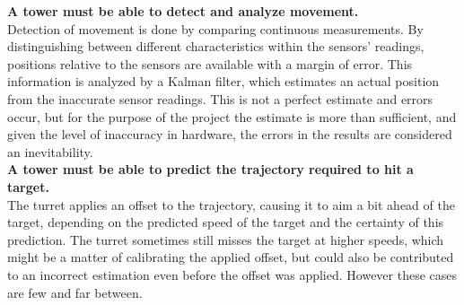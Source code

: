 \textbf{A tower must be able to detect and analyze movement.} \\
Detection of movement is done by comparing continuous measurements. By distinguishing between different characteristics within the sensors' readings, positions relative to the sensors are available with a margin of error. This information is analyzed by a Kalman filter, which estimates an actual position from the inaccurate sensor readings. This is not a perfect estimate and errors occur, but for the purpose of the project the estimate is more than sufficient, and given the level of inaccuracy in hardware, the errors in the results are considered an inevitability. \\


\textbf{A tower must be able to predict the trajectory required to hit a target.} \\
The turret applies an offset to the trajectory, causing it to aim a bit ahead of the target, depending on the predicted speed of the target and the certainty of this prediction. The turret sometimes still misses the target at higher speeds, which might be a matter of calibrating the applied offset, but could also be contributed to an incorrect estimation even before the offset was applied. However these cases are few and far between.\\



